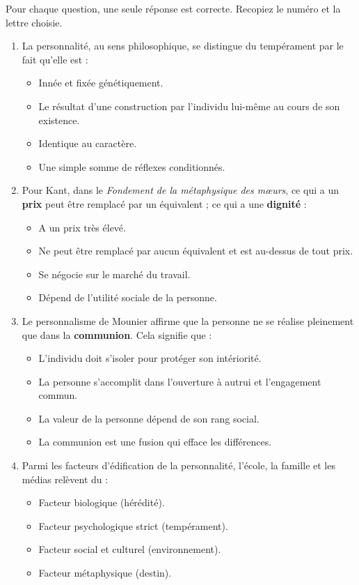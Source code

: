 \documentclass[11pt]{article}
\begin{document}
\begin{exercice}
Pour chaque question, une seule réponse est correcte. Recopiez le numéro et la lettre choisie.
\begin{enumerate}
    \item La personnalité, au sens philosophique, se distingue du tempérament par le fait qu'elle est :
    \begin{itemize}
        \item[A.] Innée et fixée génétiquement.
        \item[B.] Le résultat d'une construction par l'individu lui-même au cours de son existence.
        \item[C.] Identique au caractère.
        \item[D.] Une simple somme de réflexes conditionnés.
    \end{itemize}
    \item Pour Kant, dans le \emph{Fondement de la métaphysique des mœurs}, ce qui a un \textbf{prix} peut être remplacé par un équivalent ; ce qui a une \textbf{dignité} :
    \begin{itemize}
        \item[A.] A un prix très élevé.
        \item[B.] Ne peut être remplacé par aucun équivalent et est au-dessus de tout prix.
        \item[C.] Se négocie sur le marché du travail.
        \item[D.] Dépend de l'utilité sociale de la personne.
    \end{itemize}
    \item Le personnalisme de Mounier affirme que la personne ne se réalise pleinement que dans la \textbf{communion}. Cela signifie que :
    \begin{itemize}
        \item[A.] L'individu doit s'isoler pour protéger son intériorité.
        \item[B.] La personne s'accomplit dans l'ouverture à autrui et l'engagement commun.
        \item[C.] La valeur de la personne dépend de son rang social.
        \item[D.] La communion est une fusion qui efface les différences.
    \end{itemize}
    \item Parmi les facteurs d'édification de la personnalité, l'école, la famille et les médias relèvent du :
    \begin{itemize}
        \item[A.] Facteur biologique (hérédité).
        \item[B.] Facteur psychologique strict (tempérament).
        \item[C.] Facteur social et culturel (environnement).
        \item[D.] Facteur métaphysique (destin).
    \end{itemize}
\end{enumerate}
\end{exercice}
\end{document}
